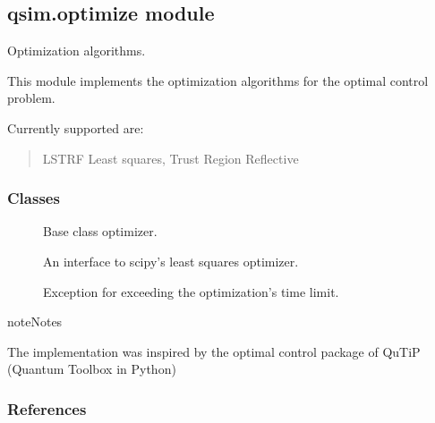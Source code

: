 \documentclass[letterpaper,10pt,english]{sphinxmanual}
\begin{document}
\subsection{qsim.optimize module}
\label{\detokenize{qsim:module-qsim.optimize}}\label{\detokenize{qsim:qsim-optimize-module}}
Optimization algorithms.

This module implements the optimization algorithms for the optimal control
problem.

Currently supported are:
\begin{quote}

LS\sphinxhyphen{}TRF \sphinxhyphen{} Least squares, Trust Region Reflective
\end{quote}


\subsubsection{Classes}
\label{\detokenize{qsim:id26}}\begin{description}
\item[{{\hyperref[\detokenize{qsim:qsim.optimize.Optimizer}]{}}}] \leavevmode
Base class optimizer.

\item[{{\hyperref[\detokenize{qsim:qsim.optimize.LeastSquaresOptimizer}]{}}}] \leavevmode
An interface to scipy’s least squares optimizer.

\item[{{\hyperref[\detokenize{qsim:qsim.optimize.WallTimeExceeded}]{}}}] \leavevmode
Exception for exceeding the optimization’s time limit.

\end{description}

\begin{sphinxadmonition}{note}{Notes}

The implementation was inspired by the optimal control package of QuTiP 
(Quantum Toolbox in Python)
\end{sphinxadmonition}
\subsubsection*{References}
\end{document}

